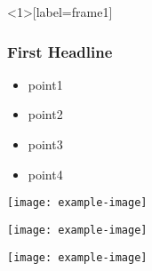 \documentclass{beamer}
\begin{document}
\begin{frame}<1>[label=frame1]
   \frametitle{First Headline}
   \begin{itemize}
      \item<1> point1    %
      \item<2> point2    %
      \item<3> point3    %
      \item<4> point4    %
   \end{itemize}
\end{frame}

\begin{frame}
   \texttt{[image: example-image]}
\end{frame}


\begin{frame}
   \texttt{[image: example-image]}
\end{frame}


\begin{frame}
   \texttt{[image: example-image]}
\end{frame}

\end{document}
